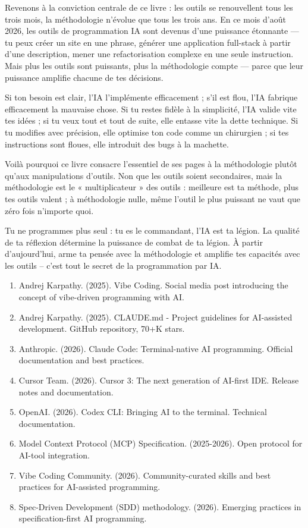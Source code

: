 
Revenons à la conviction centrale de ce livre : les outils se renouvellent tous les trois mois, la méthodologie n'évolue que tous les trois ans. En ce mois d'août 2026, les outils de programmation IA sont devenus d'une puissance étonnante — tu peux créer un site en une phrase, générer une application full-stack à partir d'une description, mener une refactorisation complexe en une seule instruction. Mais plus les outils sont puissants, plus la méthodologie compte — parce que leur puissance amplifie chacune de tes décisions.

Si ton besoin est clair, l'IA l'implémente efficacement ; s'il est flou, l'IA fabrique efficacement la mauvaise chose. Si tu restes fidèle à la simplicité, l'IA valide vite tes idées ; si tu veux tout et tout de suite, elle entasse vite la dette technique. Si tu modifies avec précision, elle optimise ton code comme un chirurgien ; si tes instructions sont floues, elle introduit des bugs à la machette.

Voilà pourquoi ce livre consacre l'essentiel de ses pages à la méthodologie plutôt qu'aux manipulations d'outils. Non que les outils soient secondaires, mais la méthodologie est le « multiplicateur » des outils : meilleure est ta méthode, plus tes outils valent ; à méthodologie nulle, même l'outil le plus puissant ne vaut que zéro fois n'importe quoi.

Tu ne programmes plus seul : tu es le commandant, l'IA est ta légion. La qualité de ta réflexion détermine la puissance de combat de ta légion. À partir d'aujourd'hui, arme ta pensée avec la méthodologie et amplifie tes capacités avec les outils – c'est tout le secret de la programmation par IA.


\begin{enumerate}
  \item Andrej Karpathy. (2025). Vibe Coding. Social media post introducing the concept of vibe-driven programming with AI.
  \item Andrej Karpathy. (2025). CLAUDE.md - Project guidelines for AI-assisted development. GitHub repository, 70+K stars.
  \item Anthropic. (2026). Claude Code: Terminal-native AI programming. Official documentation and best practices.
  \item Cursor Team. (2026). Cursor 3: The next generation of AI-first IDE. Release notes and documentation.
  \item OpenAI. (2026). Codex CLI: Bringing AI to the terminal. Technical documentation.
  \item Model Context Protocol (MCP) Specification. (2025-2026). Open protocol for AI-tool integration.
  \item Vibe Coding Community. (2026). Community-curated skills and best practices for AI-assisted programming.
  \item Spec-Driven Development (SDD) methodology. (2026). Emerging practices in specification-first AI programming.
\end{enumerate}
